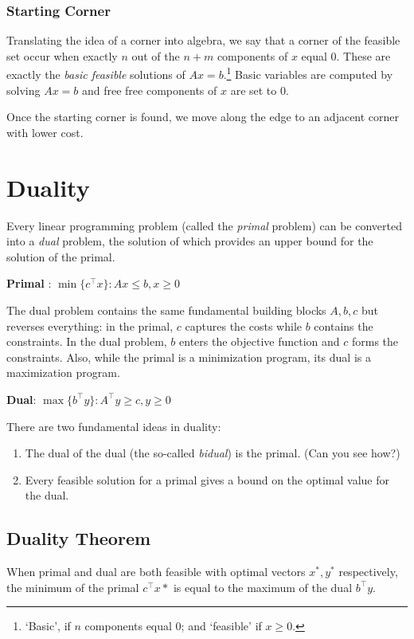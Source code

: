 \documentclass[11pt,]{article}
\providecommand{\tightlist}{%
  \setlength{\itemsep}{0pt}\setlength{\parskip}{0pt}}
\let\rmarkdownfootnote\footnote%
\def\footnote{\protect\rmarkdownfootnote}
\begin{document}
\subsubsection{Starting Corner}\label{starting-corner}

Translating the idea of a corner into algebra, we say that a corner of
the feasible set occur when exactly \(n\) out of the \(n+m\) components
of \(x\) equal 0. These are exactly the \emph{basic feasible} solutions
of \(Ax = b\).\footnote{`Basic', if \(n\) components equal 0; and
  `feasible' if \(x\geq 0\).} Basic variables are computed by solving
\(Ax = b\) and free free components of \(x\) are set to 0.

Once the starting corner is found, we move along the edge to an adjacent
corner with lower cost.

\section{Duality}\label{duality}

Every linear programming problem (called the \emph{primal} problem) can
be converted into a \emph{dual} problem, the solution of which provides
an upper bound for the solution of the primal.

\textbf{Primal }: \(\min\{c^{\top} x\}: Ax\leq b, x\geq 0\)

The dual problem contains the same fundamental building blocks
\(A, b, c\) but reverses everything: in the primal, \(c\) captures the
costs while \(b\) contains the constraints. In the dual problem, \(b\)
enters the objective function and \(c\) forms the constraints. Also,
while the primal is a minimization program, its dual is a maximization
program.

\textbf{Dual}: \(\max\{b^{\top}y\}: A^{\top}y \geq c, y\geq 0\)

There are two fundamental ideas in duality:

\begin{enumerate}
\def\labelenumi{\arabic{enumi}.}
\tightlist
\item
  The dual of the dual (the so-called \emph{bidual}) is the primal. (Can
  you see how?)
\item
  Every feasible solution for a primal gives a bound on the optimal
  value for the dual.
\end{enumerate}

\subsection{Duality Theorem}\label{duality-theorem}

When primal and dual are both feasible with optimal vectors \(x^*, y^*\)
respectively, the minimum of the primal \(c^{\top}x*\) is equal to the
maximum of the dual \(b^{\top}y\).
\end{document}
